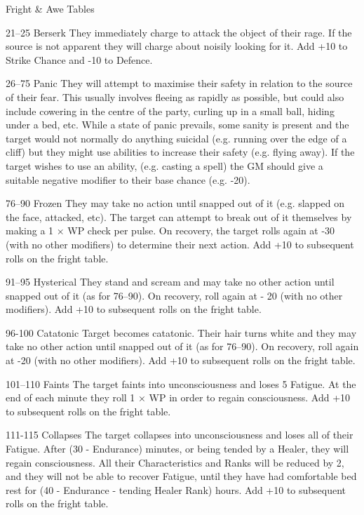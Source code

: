 \begin{Tables}{Fright \& Awe Tables}
\begin{Description}
\item[21–25] Berserk They immediately charge to attack the object of
  their rage. If the source is not apparent they will charge about
  noisily looking for it. Add +10 to Strike Chance and -10 to Defence.

\item[26–75] Panic They will attempt to maximise their safety in
  relation to the source of their fear. This usually involves fleeing
  as rapidly as possible, but could also include cowering in the
  centre of the party, curling up in a small ball, hiding under a bed,
  etc. While a state of panic prevails, some sanity is present and the
  target would not normally do anything suicidal (e.g. running over
  the edge of a cliff) but they might use abilities to increase their
  safety (e.g.  flying away). If the target wishes to use an ability,
  (e.g. casting a spell) the GM should give a suitable negative
  modifier to their base chance (e.g. -20).


\item[76–90] Frozen They may take no action until snapped out of it
  (e.g.  slapped on the face, attacked, etc). The target can attempt
  to break out of it themselves by making a 1 × WP check per pulse. On
  recovery, the target rolls again at -30 (with no other modifiers) to
  determine their next action. Add +10 to subsequent rolls on the
  fright table.

\item[91–95] Hysterical They stand and scream and may take no other
  action until snapped out of it (as for 76–90). On recovery, roll
  again at - 20 (with no other modifiers). Add +10 to subsequent rolls
  on the fright table.

\item[96-100] Catatonic Target becomes catatonic. Their hair turns
  white and they may take no other action until snapped out of it (as
  for 76–90). On recovery, roll again at -20 (with no other
  modifiers). Add +10 to subsequent rolls on the fright table.

\item[101–110] Faints The target faints into unconsciousness and loses
  5 Fatigue.  At the end of each minute they roll 1 × WP in order to
  regain consciousness. Add +10 to subsequent rolls on the fright
  table.


\item[111-115] Collapses The target collapses into unconsciousness and
  loses all of their Fatigue. After (30 - Endurance) minutes, or being
  tended by a Healer, they will regain consciousness. All their
  Characteristics and Ranks will be reduced by 2, and they will not be
  able to recover Fatigue, until they have had comfortable bed rest
  for (40 - Endurance - tending Healer Rank) hours. Add +10 to
  subsequent rolls on the fright table.


\end{Description}
\end{Tables}
